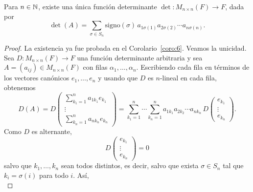 \documentclass[12pt,a4paper]{book}
\begin{document}
    \begin{teorema}
    \label{teo:13}
        Para $n \in \mathbb{N}$, existe una única función determinante $\det: M_{n \times n}(F) \to F$, dada por
        \begin{equation}
            \det(A) = \sum_{\sigma \in S_{n}} \text{signo}(\sigma) \, a_{1\sigma(1)} a_{2\sigma(2)} \cdots a_{n\sigma(n)}.
            \label{eq:leibniz}
        \end{equation}
    \end{teorema}

    \begin{proof}
        La existencia ya fue probada en el Corolario~\ref{coro:6}. Veamos la unicidad. Sea $D: M_{n \times n}(F) \to F$ una función determinante arbitraria y sea $A = (a_{ij}) \in M_{n \times n}(F)$ con filas $\alpha_{1}, \dots, \alpha_{n}$. Escribiendo cada fila en términos de los vectores canónicos $e_{1}, \dots, e_{n}$ y usando que $D$ es $n$-lineal en cada fila, obtenemos
        \begin{equation*}
            D(A) = D
            \begin{pmatrix}
                \sum_{k_{1} = 1}^{n} a_{1k_{1}} e_{k_{1}} \\
                \vdots \\
                \sum_{k_{n} = 1}^{n} a_{nk_{n}} e_{k_{n}}
            \end{pmatrix}
            = \sum_{k_{1} = 1}^{n} \cdots \sum_{k_{n} = 1}^{n} a_{1k_{1}} a_{2k_{2}} \cdots a_{nk_{n}} \, D
            \begin{pmatrix}
                e_{k_{1}} \\
                \vdots \\
                e_{k_{n}}
            \end{pmatrix}.
        \end{equation*}
        Como $D$ es alternante,
        \begin{equation*}
            D
            \begin{pmatrix}
                e_{k_{1}} \\
                \vdots \\
                e_{k_{n}}
            \end{pmatrix}
            = 0
        \end{equation*}
        salvo que $k_{1}, \dots, k_{n}$ sean todos distintos, es decir, salvo que exista $\sigma \in S_{n}$ tal que $k_{i} = \sigma(i)$ para todo $i$. Así,
        \begin{equation*}

\end{equation*}
\end{proof}
\end{document}
